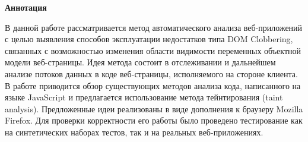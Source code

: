 
\setlength{\parskip}{0pt}
\begin{center}
	{\LARGE{\textbf{Аннотация}} \par}
\end{center}
\bigskip
     В данной работе рассматривается метод автоматического анализа веб-приложений с целью выявления способов эксплуатации недостатков типа DOM Clobbering, связанных с возможностью изменения области видимости переменных объектной модели веб-страницы. Идея метода состоит в отслеживании и дальнейшем анализе потоков данных в коде веб-страницы, исполняемого на стороне клиента.
     В работе приводится обзор существующих методов анализа кода, написанного на языке JavaScript и предлагается использование метода тейнтирования (taint analysis).
     Предложенные идеи реализованы в виде дополнения к браузеру Mozilla Firefox. Для проверки корректности его работы было проведено тестирование как на синтетических наборах тестов, так и на реальных веб-приложениях.
\bigskip




